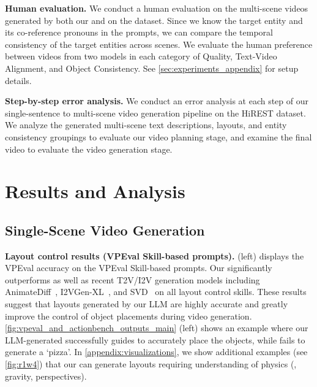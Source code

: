\documentclass{article}
\begin{document}
\begin{itemize}[leftmargin=1em]
\end{itemize}








\vspace{3pt}
\noindent\textbf{Human evaluation.}
We conduct a human evaluation on the multi-scene videos generated by both our \method{} and \modelscope{} on the \corefdata{} dataset.
Since we know the target entity and its co-reference pronouns in the \corefdata{} prompts, we can compare the temporal consistency of the target entities across scenes.
We evaluate the human preference between videos from two models in each category of Quality, Text-Video Alignment, and Object Consistency.
See \cref{sec:experiments_appendix} for setup details. 

\noindent\textbf{Step-by-step error analysis.}
We conduct an error analysis at each step of our single-sentence to multi-scene video generation pipeline on the HiREST dataset.
We analyze the generated multi-scene text descriptions, layouts, and entity consistency groupings to evaluate our video planning stage, and examine the final video to evaluate the video generation stage. 





\section{Results and Analysis}
\label{sec:results}



\subsection{Single-Scene Video Generation}\label{sec:single_scene_video_gen}



\noindent\textbf{Layout control results (VPEval Skill-based prompts).}
 (left) displays the VPEval accuracy on the VPEval Skill-based prompts.
Our \method{} significantly outperforms \modelscope{} as well as recent T2V/I2V generation models including AnimateDiff~\citep{guo2023animatediff}, I2VGen-XL~\citep{zhang2023i2vgen}, and SVD~\citep{blattmann2023stable} on all layout control skills. 
These results suggest that layouts
generated by our LLM are highly accurate and greatly improve the control of object placements during video generation.
\cref{fig:vpeval_and_actionbench_outputs_main} (left) shows an example where our LLM-generated \videoplan{} successfully guides \videomodule{} to accurately place the objects, while \modelscope{} fails to generate a `pizza'. In \cref{appendix:visualizations}, we show additional examples (see \cref{fig:r1w4}) that our \videoplan{} can generate layouts requiring understanding of physics (\eg{}, gravity, perspectives).
\end{document}

